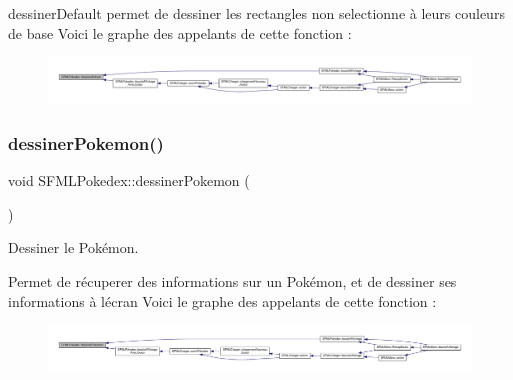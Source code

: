 dessiner\+Default permet de dessiner les rectangles non selectionne à leurs couleurs de base Voici le graphe des appelants de cette fonction \+:\nopagebreak
\begin{figure}[H]
\begin{center}
\leavevmode
\includegraphics[width=350pt]{class_s_f_m_l_pokedex_ae5f87a7a8a5cb0e6d151f15646d7e4af_icgraph}
\end{center}
\end{figure}
\mbox{\label{class_s_f_m_l_pokedex_a7693d7d78e637f1839f0459985cb59e3}} 
\subsubsection{\texorpdfstring{dessiner\+Pokemon()}{dessinerPokemon()}}
{\footnotesize\ttfamily void S\+F\+M\+L\+Pokedex\+::dessiner\+Pokemon (\begin{DoxyParamCaption}{ }\end{DoxyParamCaption})\hspace{0.3cm}{\ttfamily [private]}}



Dessiner le Pokémon. 

Permet de récuperer des informations sur un Pokémon, et de dessiner ses informations à l\textquotesingle{}écran Voici le graphe des appelants de cette fonction \+:\nopagebreak
\begin{figure}[H]
\begin{center}
\leavevmode
\includegraphics[width=350pt]{class_s_f_m_l_pokedex_a7693d7d78e637f1839f0459985cb59e3_icgraph}
\end{center}
\end{figure}
\mbox{\label{class_s_f_m_l_pokedex_a4cec507ffcc5916c32c8b14211c991fa}} 
